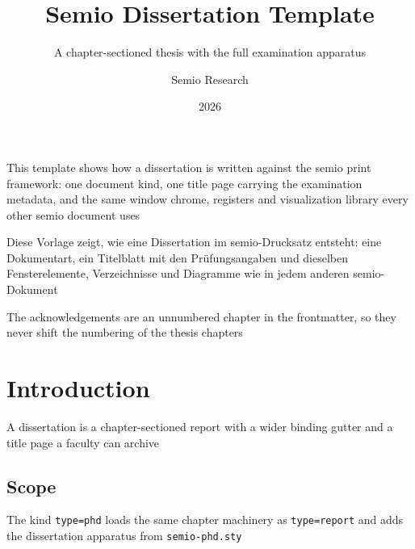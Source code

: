 \title{Semio Dissertation Template}
\subtitle{A chapter-sectioned thesis with the full examination apparatus}
\author{Semio Research}
\date{2026}






\makedissertationtitle

\begin{Abstract}
  This template shows how a dissertation is written against the semio print framework: one document kind, one title page carrying the examination metadata, and the same window chrome, registers and visualization library every other semio document uses
\end{Abstract}

\begin{Kurzfassung}
  Diese Vorlage zeigt, wie eine Dissertation im semio-Drucksatz entsteht: eine Dokumentart, ein Titelblatt mit den Prüfungsangaben und dieselben Fensterelemente, Verzeichnisse und Diagramme wie in jedem anderen semio-Dokument
\end{Kurzfassung}

\begin{Acknowledgements}
  The acknowledgements are an unnumbered chapter in the frontmatter, so they never shift the numbering of the thesis chapters
\end{Acknowledgements}

\makedeclaration

\clearpage
\tableofcontents

\makemainmatter

\chapter{Introduction}
A dissertation is a chapter-sectioned report with a wider binding gutter and a title page a faculty can archive \cite{semio2026}

\section{Scope}
\begin{Window}[title=Document Kind]
  The kind \texttt{type=phd} loads the same chapter machinery as \texttt{type=report} and adds the dissertation apparatus from \texttt{semio-phd.sty}
\end{Window}


